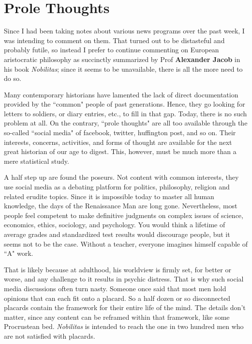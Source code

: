 \section{Prole Thoughts}

Since I had been taking notes about various news programs over the past week, I was intending to comment on them. That turned out to be distasteful and probably futile, so instead I prefer to continue commenting on European aristocratic philosophy as succinctly summarized by Prof \textbf{Alexander Jacob} in his book \emph{Nobilitas}; since it seems to be unavailable, there is all the more need to do so.

Many contemporary historians have lamented the lack of direct documentation provided by the ``common" people of past generations. Hence, they go looking for letters to soldiers, or diary entries, etc., to fill in that gap. Today, there is no such problem at all. On the contrary, ``prole thoughts" are all too available through the so-called ``social media" of facebook, twitter, huffington post, and so on. Their interests, concerns, activities, and forms of thought are available for the next great historian of our age to digest. This, however, must be much more than a mere statistical study.

A half step up are found the poseurs. Not content with common interests, they use social media as a debating platform for politics, philosophy, religion and related erudite topics. Since it is impossible today to master all human knowledge, the days of the Renaissance Man are long gone. Nevertheless, most people feel competent to make definitive judgments on complex issues of science, economics, ethics, sociology, and psychology. You would think a lifetime of average grades and standardized test results would discourage people, but it seems not to be the case. Without a teacher, everyone imagines himself capable of ``A" work.

That is likely because at adulthood, his worldview is firmly set, for better or worse, and any challenge to it results in psychic distress. That is why such social media discussions often turn nasty. Someone once said that most men hold opinions that can each fit onto a placard. So a half dozen or so disconnected placards contain the framework for their entire life of the mind. The details don't matter, since any content can be reframed within that framework, like some Procrustean bed. \emph{Nobilitas} is intended to reach the one in two hundred men who are not satisfied with placards.

